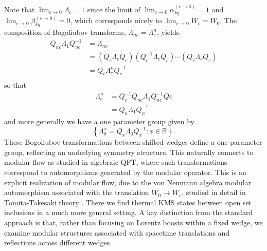 \documentclass[12pt,a4paper]{article}
\begin{document}
Note that $\lim_{c\to 0} \Lambda_c = 1$ since the limit of $\lim_{c\to 0} \alpha_{kq}^{(c \rightarrow 0)} = 1$ and $\lim_{c\to 0} \beta_{kq}^{(c \rightarrow 0)} = 0$, which corresponds nicely to $\lim_{c\to 0} W_c = W_0$. The composition of Bogoliubov transforms, $\Lambda_{nc} = \Lambda_c^n$, yields
\begin{equation}
  \begin{array}{ll}    
    Q_{nc} \Lambda_1 Q_{nc}^{-1}  &= \Lambda_{nc} \\
         &= \left(Q_c \Lambda_{c} Q_c\right) \left( Q_c^{-1} \Lambda_{c} Q_c\right) \cdots \left(Q_c \Lambda_{c} Q_c\right) \\
  &= Q_c \Lambda_c^n Q_c^{-1} \\
  \end{array}
\end{equation}
so that
\begin{equation}
  \begin{array}{ll}
  \Lambda_c^n &= Q_c^{-1} Q_{nc} \Lambda_1 Q_{nc}^{-1} Q{c} \\
  &= Q_n \Lambda_1 Q_n^{-1}
  \end{array}
\end{equation}
and more generally we have a one parameter group given by
\begin{equation}
  \left\{\Lambda_0^x = Q_x \Lambda_0 Q_x^{-1} : x \in \mathbb{R} \right\}.
\end{equation}
These Bogoliubov transformations between shifted wedges define a one-parameter group, reflecting an underlying symmetry structure. This naturally connects to modular flow as studied in algebraic QFT, where such transformations correspond to automorphisms generated by the modular operator. This is an explicit realization of modular flow, due to the von Neumann algebra modular automorphism associated with the translation $W_0 \rightarrow W_c$, studied in detail in Tomita-Takesaki theory \cite{borchers2000revolutionizing}.  There we find thermal KMS states between open set inclusions in a much more general setting.  A key distinction from the standard approach is that, rather than focusing on Lorentz boosts within a fixed wedge, we examine modular structures associated with spacetime translations and reflections across different wedges.
\end{document}
